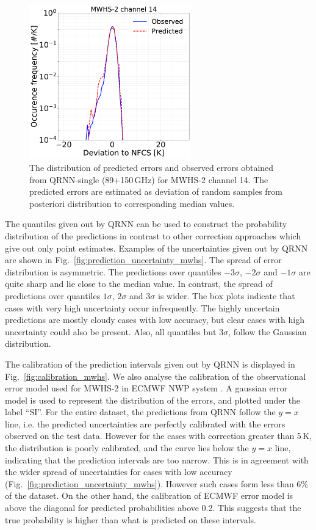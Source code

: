 \documentclass[amt, manuscript]{copernicus}
\begin{document}
\begin{figure}[t]
	\includegraphics[width=70mm]{Figures/deviation_posterior_mwhs_samples_14.pdf}	
	\caption{The distribution of predicted errors and observed errors  obtained from QRNN-single (89+150\,GHz) for MWHS-2 channel 14. The predicted errors are estimated as deviation of random samples from posteriori distribution to corresponding median values.}
	\label{fig:predicted_errors_mwhs}	
\end{figure}

The quantiles given out by QRNN can be used to construct the probability distribution of the predictions in contrast to other correction approaches which give out only point estimates. Examples of the uncertainties given out by QRNN are shown in Fig.~\ref{fig:prediction_uncertainty_mwhs}. The spread of error distribution is asymmetric. The predictions over quantiles $-3\sigma$, $-2\sigma$ and $-1\sigma$ are quite sharp and lie close to the median value. In contrast, the spread of predictions over quantiles $1\sigma$, $2\sigma$ and $3\sigma$ is wider. The box plots indicate that cases with very high uncertainty occur infrequently. The highly uncertain predictions are mostly cloudy cases with low accuracy, but clear cases with high uncertainty could also be present. Also, all quantiles but  $3\sigma$, follow the Gaussian distribution.  

The calibration of the prediction intervals given out by QRNN is displayed in Fig.~\ref{fig:calibration_mwhs}. We also analyse the calibration of the observational error model used for MWHS-2 in ECMWF NWP system \citep{lawrence2018FY3C}. A gaussian error model is used to represent the distribution of the errors, and plotted under the label ``SI''. For the entire dataset, the predictions from QRNN follow the $y=x$ line, i.e. the predicted uncertainties are perfectly calibrated with the errors observed on the test data. However for the cases with correction greater than 5\,K, the distribution is poorly calibrated, and the curve lies below the $y =x$ line, indicating that the prediction intervals are too narrow. This is in agreement with the wider spread of uncertainties for cases with low accuracy (Fig.~\ref{fig:prediction_uncertainty_mwhs}). However such cases form less than 6\% of the dataset. On the other hand, the calibration of ECMWF error model is above the diagonal for predicted probabilities above 0.2. This suggests that the true probability is higher than what is predicted on these intervals. 
\end{document}
